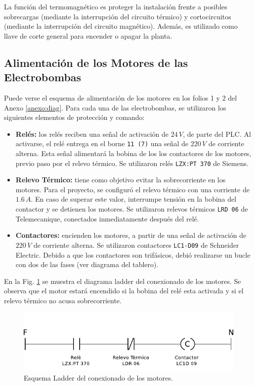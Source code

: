 La función del termomagnético es proteger la instalación frente a posibles
sobrecargas (mediante la interrupción del circuito térmico) y cortocircuitos
(mediante la interrupción del circuito magnético).
Además, es utilizado como llave de corte general para encender o apagar la
planta.

\subsection{Alimentación de los Motores de las Electrobombas}
\label{subsec:alimentacionMotores}
Puede verse el esquema de alimentación de los motores en los folios 1 y 2 del
Anexo \ref{anexo:diag}.
Para cada una de las electrobombas, se utilizaron los siguientes elementos de
protección y comando:
\begin{itemize}
 \item \textbf{Relés:}
 los relés reciben una señal de activación de $24\,V$, de parte del PLC.
 Al activarse, el relé entrega en el borne \verb|11 (7)| una señal de $220\,V$
de corriente alterna.
Esta señal alimentará la bobina de los los contactores de los motores, previo 
paso por el relevo térmico. Se utilizaron relés \verb|LZX:PT 370| de Siemens.
 \item \textbf{Relevo Térmico:}
 tiene como objetivo evitar la sobrecorriente en los motores.
 Para el proyecto, se configuró el relevo térmico con una corriente
 de $1.6\,A$.
 En caso de superar este valor, interrumpe tensión en la bobina
 del contactor y se detienen los motores.
 Se utilizaron relevos térmicos \verb|LRD 06| de Telemecanique, conectados
inmediatamente después del relé.
 \item \textbf{Contactores:}
 encienden los motores, a partir de una señal de activación de $220\,V$ de
corriente alterna.
Se utilizaron contactores \verb|LC1-D09| de Schneider Electric.
Debido a que los contactores son trifásicos, debió realizarse un bucle con dos
de las fases (ver diagrama del tablero).
\end{itemize}

En la Fig. \ref{fig:diagramaLadderContactor} se muestra el diagrama ladder
del conexionado de los motores.
Se observa que  el motor estará encendido si la bobina del relé esta activada y
si el relevo térmico no acusa sobrecorriente.

\begin{figure}
 \centering
 \includegraphics[scale=1.1]{Cap3-TableroElectrico/Images/ladderConexion.pdf}
 \caption{Esquema Ladder del conexionado de los motores.}
 \label{fig:diagramaLadderContactor}
\end{figure}

